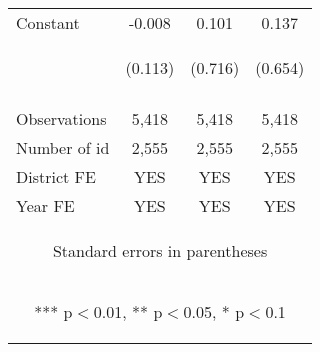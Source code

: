 \begin{center}
\begin{tabular}{lccc}
Constant & -0.008 & 0.101 & 0.137 \\
 & \begin{footnotesize}(0.113)\end{footnotesize} & \begin{footnotesize}(0.716)\end{footnotesize} & \begin{footnotesize}(0.654)\end{footnotesize} \\
\vspace{4pt} & \begin{footnotesize}\end{footnotesize} & \begin{footnotesize}\end{footnotesize} & \begin{footnotesize}\end{footnotesize} \\
Observations & 5,418 & 5,418 & 5,418 \\
Number of id & 2,555 & 2,555 & 2,555 \\
District FE & YES & YES & YES \\
 Year FE & YES & YES & YES \\ \hline
\multicolumn{4}{c}{\begin{footnotesize} Standard errors in parentheses\end{footnotesize}} \\
\multicolumn{4}{c}{\begin{footnotesize} *** p$<$0.01, ** p$<$0.05, * p$<$0.1\end{footnotesize}} \\
\end{tabular}
\end{center}
